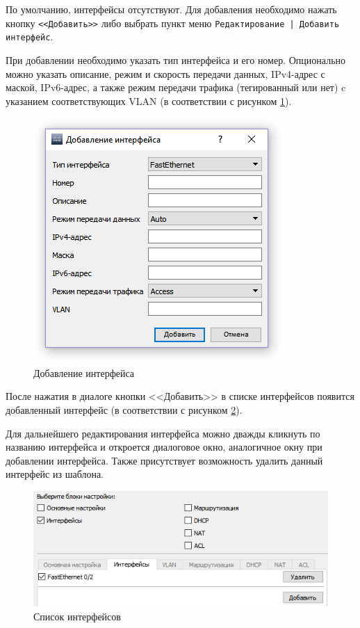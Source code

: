 \begin{enumerate}
\begin{enumerate}
По умолчанию, интерфейсы отсутствуют. Для добавления необходимо нажать кнопку \texttt{<<Добавить>>} либо выбрать пункт меню \texttt{Редактирование | Добавить интерфейс}. 

При добавлении необходимо указать тип интерфейса и его номер. Опционально можно указать описание, режим и скорость передачи данных, IPv4-адрес с маской, IPv6-адрес, а также режим передачи трафика (тегированный или нет) c указанием соответствующих VLAN (в соответствии с рисунком \ref{fig:add_interface}).

\begin{figure}[th!]
	\centering
	\includegraphics[width=0.8\linewidth]{pic/add_interface}
	\caption{Добавление интерфейса}
	\label{fig:add_interface}
\end{figure}

После нажатия в диалоге кнопки <<Добавить>> в списке интерфейсов появится добавленный интерфейс (в соответствии с рисунком \ref{fig:add_interface_2}).

Для дальнейшего редактирования интерфейса можно дважды кликнуть по названию интерфейса и откроется диалоговое окно, аналогичное окну при добавлении интерфейса. Также присутствует возможность удалить данный интерфейс из шаблона.


\begin{figure}[th!]
\centering
\includegraphics[width=1\linewidth]{pic/add_interface_2}
\caption{Список интерфейсов}
\label{fig:add_interface_2}
\end{figure}


\end{enumerate}
\end{enumerate}
